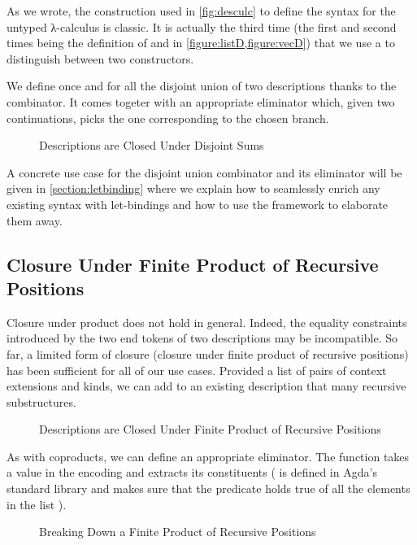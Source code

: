 As we wrote, the construction used in \cref{fig:desculc} to define the
syntax for the untyped λ-calculus is classic. It is actually the third
time (the first and second times being the definition of  and
 in \cref{figure:listD,figure:vecD}) that we use a 
to distinguish between two constructors.

We define once and for all the disjoint union of two descriptions thanks
to the  combinator. It comes togeter with an appropriate
eliminator  which, given two continuations, picks the one
corresponding to the chosen branch.

\begin{figure}[h]
\caption{Descriptions are Closed Under Disjoint Sums\label{figure:descsum}}
\end{figure}

A concrete use case for the disjoint union combinator and its eliminator
will be given in \cref{section:letbinding} where we explain how to seamlessly
enrich any existing syntax with let-bindings and how to use the 
framework to elaborate them away.

\subsection{Closure Under Finite Product of Recursive Positions}

Closure under product does not hold in general. Indeed, the equality constraints
introduced by the two end tokens of two descriptions may be incompatible. So far,
a limited form of closure (closure under finite product of recursive positions)
has been sufficient for all of our use cases. Provided a list of pairs of context
extensions and kinds, we can add to an existing description that many recursive
substructures.

\begin{figure}[h]
\caption{Descriptions are Closed Under Finite Product of Recursive Positions\label{figure:descprod}}
\end{figure}

As with coproducts, we can define an appropriate eliminator. The function 
takes a value in the encoding and extracts its constituents ({  }
is defined in Agda's standard library and makes sure that the predicate  holds
true of all the elements in the list ).

\begin{figure}[h]
\caption{Breaking Down a Finite Product of Recursive Positions\label{figure:descprodelim}}
\end{figure}

